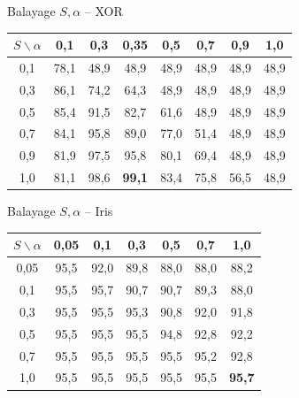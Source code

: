 \documentclass[10pt,aspectratio=169]{beamer}
\begin{document}
\begin{frame}{Balayage $S,\alpha$ -- XOR}
\begin{center}
\renewcommand{\arraystretch}{1.15}
\begin{tabular}{cccccccc}
\toprule
$S \backslash \alpha$ & 0,1 & 0,3 & 0,35 & 0,5 & 0,7 & 0,9 & 1,0 \\
\midrule
0,1 & 78,1 & \cellcolor{red!15}48,9 & \cellcolor{red!15}48,9 & \cellcolor{red!15}48,9 & \cellcolor{red!15}48,9 & \cellcolor{red!15}48,9 & \cellcolor{red!15}48,9 \\
0,3 & 86,1 & 74,2 & 64,3 & \cellcolor{red!15}48,9 & \cellcolor{red!15}48,9 & \cellcolor{red!15}48,9 & \cellcolor{red!15}48,9 \\
0,5 & 85,4 & 91,5 & 82,7 & 61,6 & \cellcolor{red!15}48,9 & \cellcolor{red!15}48,9 & \cellcolor{red!15}48,9 \\
0,7 & 84,1 & 95,8 & 89,0 & 77,0 & 51,4 & \cellcolor{red!15}48,9 & \cellcolor{red!15}48,9 \\
0,9 & 81,9 & 97,5 & 95,8 & 80,1 & 69,4 & \cellcolor{red!15}48,9 & \cellcolor{red!15}48,9 \\
1,0 & 81,1 & 98,6 & \textbf{99,1} & 83,4 & 75,8 & 56,5 & \cellcolor{red!15}48,9 \\
\bottomrule
\end{tabular}
\end{center}
\end{frame}

\begin{frame}{Balayage $S,\alpha$ -- Iris}
\begin{center}
\renewcommand{\arraystretch}{1.15}
\begin{tabular}{ccccccc}
\toprule
$S \backslash \alpha$ & 0,05 & 0,1 & 0,3 & 0,5 & 0,7 & 1,0 \\
\midrule
0,05 & 95,5 & 92,0 & 89,8 & 88,0 & 88,0 & 88,2 \\
0,1  & 95,5 & 95,7 & 90,7 & 90,7 & 89,3 & 88,0 \\
0,3  & 95,5 & 95,5 & 95,3 & 90,8 & 92,0 & 91,8 \\
0,5  & 95,5 & 95,5 & 95,5 & 94,8 & 92,8 & 92,2 \\
0,7  & 95,5 & 95,5 & 95,5 & 95,5 & 95,2 & 92,8 \\
1,0  & 95,5 & 95,5 & 95,5 & 95,5 & 95,5 & \textbf{95,7} \\
\bottomrule
\end{tabular}
\end{center}
\end{frame}
\end{document}
